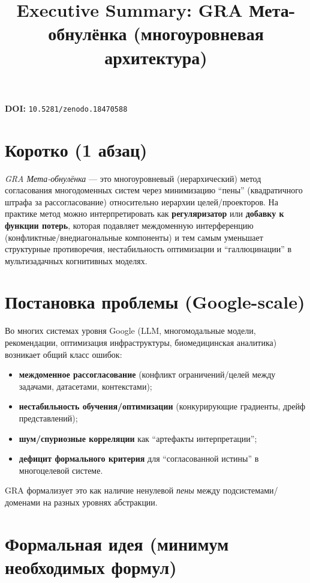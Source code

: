 \documentclass[11pt]{article}
\title{Executive Summary: GRA Мета-обнулёнка (многоуровневая архитектура)}
\author{}
\date{}
\begin{document}
\maketitle

\textbf{DOI:} \texttt{10.5281/zenodo.18470588}

\section{Коротко (1 абзац)}

\emph{GRA Мета-обнулёнка} --- это многоуровневый (иерархический) метод согласования многодоменных систем через минимизацию ``пены'' (квадратичного штрафа за рассогласование) относительно иерархии целей/проекторов. На практике метод можно интерпретировать как \textbf{регуляризатор} или \textbf{добавку к функции потерь}, которая подавляет междоменную интерференцию (конфликтные/внедиагональные компоненты) и тем самым уменьшает структурные противоречия, нестабильность оптимизации и ``галлюцинации'' в мультизадачных когнитивных моделях.

\section{Постановка проблемы (Google-scale)}

Во многих системах уровня Google (LLM, многомодальные модели, рекомендации, оптимизация инфраструктуры, биомедицинская аналитика) возникает общий класс ошибок:
\begin{itemize}[leftmargin=*, itemsep=2pt]
  \item \textbf{междоменное рассогласование} (конфликт ограничений/целей между задачами, датасетами, контекстами);
  \item \textbf{нестабильность обучения/оптимизации} (конкурирующие градиенты, дрейф представлений);
  \item \textbf{шум/спуриозные корреляции} как ``артефакты интерпретации'';
  \item \textbf{дефицит формального критерия} для ``согласованной истины'' в многоцелевой системе.
\end{itemize}

GRA формализует это как наличие ненулевой \emph{пены} между подсистемами/доменами на разных уровнях абстракции.

\section{Формальная идея (минимум необходимых формул)}
\end{document}
